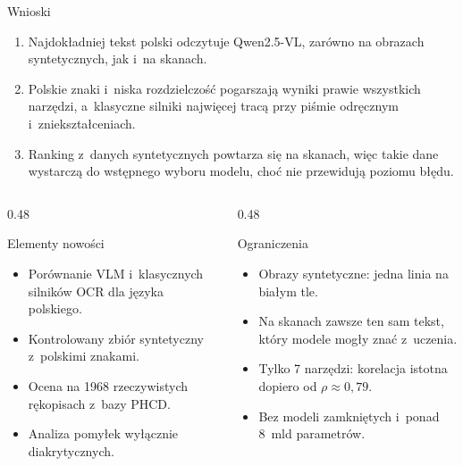 \documentclass[aspectratio=169,11pt]{beamer}
\newenvironment{rowna}[1]{\vspace*{-0.5\baselineskip}\begin{minipage}[t][#1][t]{\linewidth}\vspace{0pt}\raggedright}{\end{minipage}}
\begin{document}
\begin{frame}{Wnioski}
  \small
  \begin{enumerate}
    \setlength{\itemsep}{1pt}
    \item Najdokładniej tekst polski odczytuje Qwen2.5-VL, zarówno na obrazach syntetycznych, jak i~na skanach.
    \item Polskie znaki i~niska rozdzielczość pogarszają wyniki prawie wszystkich narzędzi, a~klasyczne silniki
      najwięcej tracą przy piśmie odręcznym i~zniekształceniach.
    \item Ranking z~danych syntetycznych powtarza się na skanach, więc takie dane wystarczą do wstępnego wyboru
      modelu, choć nie przewidują poziomu błędu.
  \end{enumerate}
  \begin{columns}[t]
    \begin{column}{0.48\textwidth}
      \begin{block}{Elementy nowości}
        \begin{rowna}{2.9cm}
        \footnotesize
        \setlength{\leftmargini}{1.2em}
        \begin{itemize}
          \setlength{\itemsep}{1pt}
          \item Porównanie VLM i~klasycznych silników OCR dla języka polskiego.
          \item Kontrolowany zbiór syntetyczny z~polskimi znakami.
          \item Ocena na 1968 rzeczywistych rękopisach z~bazy PHCD.
          \item Analiza pomyłek wyłącznie diakrytycznych.
        \end{itemize}
        \end{rowna}
      \end{block}
    \end{column}
    \begin{column}{0.48\textwidth}
      \begin{block}{Ograniczenia}
        \begin{rowna}{2.9cm}
        \footnotesize
        \setlength{\leftmargini}{1.2em}
        \begin{itemize}
          \setlength{\itemsep}{1pt}
          \item Obrazy syntetyczne: jedna linia na białym tle.
          \item Na skanach zawsze ten sam tekst, który modele mogły znać z~uczenia.
          \item Tylko 7 narzędzi: korelacja istotna dopiero od $\rho \approx 0{,}79$.
          \item Bez modeli zamkniętych i~ponad 8~mld parametrów.
        \end{itemize}
        \end{rowna}
      \end{block}
    \end{column}
  \end{columns}
\end{frame}
\end{document}
